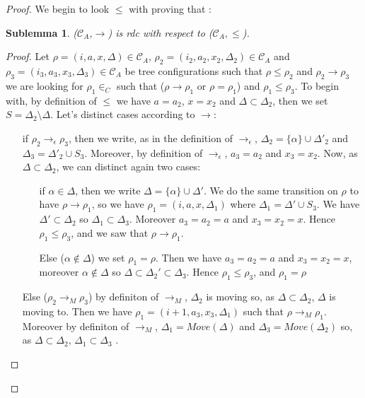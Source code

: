 \documentclass[a4paper,10pt]{report}
\newtheorem{slm}{Sublemma}[lm]
\newcommand{\C}{\mathcal{C}_{A}}
\begin{document}
\begin{proof}
  We begin to look $\leq$ with proving that :
  \begin{slm}
    ($\C$,$\rightarrow$) is rdc with respect to ($\C,\leq$).
  \end{slm}
   \begin{proof}
   Let $\rho = (i,a,x,\Delta) \in \C$, $\rho_2 = (i_2,a_2,x_2,\Delta_2) \in \C$ and $\rho_3 = (i_3,a_3,x_3,\Delta_3) \in \C$ be tree configurations 
   such that $\rho \leq \rho_2$ and $\rho_2 \rightarrow \rho_3$ we are looking for $\rho_1 \in _C$ such that ($\rho \rightarrow \rho_1$ or $\rho = \rho_1$) and $\rho_1 \leq \rho_3$.
   To begin with, by definition of $\leq$ we have $a = a_2$, $x= x_2$ and $\Delta \subset \Delta_2$, then we set $S = \Delta_2 \setminus \Delta$. Let's distinct cases according to $\rightarrow$: 
   \begin{itemize}
    \item [if $\rho_2 \rightarrow_{\epsilon} \rho_3$,] 
    then we write, as in the definition of $\rightarrow_{\epsilon}$,  $\Delta_2 = \{\alpha \} \cup \Delta'_2$ and $\Delta_3 = \Delta'_2 \cup S_3$.
    Moreover, by definition of $\rightarrow_{\epsilon}$, $a_3 = a_2$ and $x_3 = x_2$.
    Now, as $\Delta \subset \Delta_2$, we can distinct again two cases:
      \begin{itemize}
	\item [if $\alpha \in \Delta$,] then we write $\Delta = \{\alpha \} \cup \Delta'$.  
	We do the same transition on $\rho$ to have $\rho \rightarrow \rho_1$, so we have $\rho_1 = (i,a,x,\Delta_1)$ where $\Delta_1 = \Delta' \cup S_3$. 
	We have $\Delta' \subset \Delta_2$ so $\Delta_1 \subset \Delta_3$.
	Moreover $a_3= a_2 = a$ and $x_3 = x_2 = x$.
	Hence $\rho_1 \leq \rho_3$, and we saw that $\rho \rightarrow \rho_1$.
	\item [Else ($\alpha \notin \Delta$)] we set $\rho_1 = \rho$. Then we have $a_3= a_2 = a$ and $x_3 = x_2 = x$, moreover $\alpha \notin \Delta $ so $\Delta \subset \Delta_2' \subset \Delta_3$.
	Hence $\rho_1 \leq \rho_3$, and $\rho_1 = \rho$ 
      \end{itemize}
     \item [Else ($\rho_2 \rightarrow_{M} \rho_3$)] by definiton of $\rightarrow_{M}$, $\Delta_2$ is moving so, as $\Delta \subset \Delta_2$, $\Delta$ is moving to.
     Then we have $\rho_1 = (i+1,a_3,x_3,\Delta_1)$ such that $\rho \rightarrow_{M} \rho_1$.
     Moreover by definiton of $\rightarrow_{M}$, $\Delta_1 = Move(\Delta)$ and $\Delta_3 = Move(\Delta_2)$ so, as $\Delta \subset \Delta_2$, $\Delta_1 \subset \Delta_3$ . 

\end{itemize}
\end{proof}
\end{proof}
\end{document}

